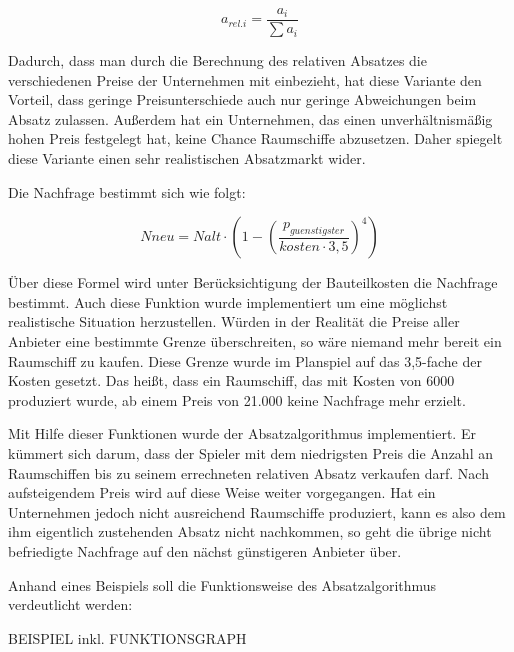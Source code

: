 \begin{equation}
     a_{rel. i} = \frac{a_i}{\sum a_i}
     \label{alg:spielwelt-logik-absatzmengen-2}
\end{equation}

Dadurch, dass man durch die Berechnung des relativen Absatzes die verschiedenen Preise der Unternehmen mit einbezieht, hat
diese Variante den Vorteil, dass geringe Preisunterschiede auch nur geringe Abweichungen beim Absatz zulassen. Außerdem hat
ein Unternehmen, das einen unverhältnismäßig hohen Preis festgelegt hat, keine Chance Raumschiffe abzusetzen. Daher spiegelt
diese Variante einen sehr realistischen Absatzmarkt wider.

Die Nachfrage bestimmt sich wie folgt:

\begin{equation}
     N{neu} = N{alt} \cdot (1 - (\frac{p_{guenstigster}}{kosten \cdot 3,5})^4)
     \label{alg:spielwelt-logik-absatzmengen-3}
\end{equation}

Über diese Formel wird unter Berücksichtigung der Bauteilkosten die Nachfrage bestimmt. Auch diese Funktion wurde implementiert
um eine möglichst realistische Situation herzustellen. Würden in der Realität die Preise aller Anbieter eine bestimmte Grenze
überschreiten, so wäre niemand mehr bereit ein Raumschiff zu kaufen. Diese Grenze wurde im Planspiel auf das 3,5-fache der Kosten
gesetzt. Das heißt, dass ein Raumschiff, das mit Kosten von 6000\curr{} produziert wurde, ab einem Preis von 21.000\curr{} keine
Nachfrage mehr erzielt.

Mit Hilfe dieser Funktionen wurde der Absatzalgorithmus implementiert. Er kümmert sich darum, dass der Spieler mit dem niedrigsten
Preis die Anzahl an Raumschiffen bis zu seinem errechneten relativen Absatz verkaufen darf. Nach aufsteigendem Preis wird auf
diese Weise weiter vorgegangen. Hat ein Unternehmen jedoch nicht ausreichend Raumschiffe produziert, kann es also dem ihm eigentlich
zustehenden Absatz nicht nachkommen, so geht die übrige nicht befriedigte Nachfrage auf den nächst günstigeren Anbieter über.

\bigskip

Anhand eines Beispiels soll die Funktionsweise des Absatzalgorithmus verdeutlicht werden:

BEISPIEL inkl. FUNKTIONSGRAPH